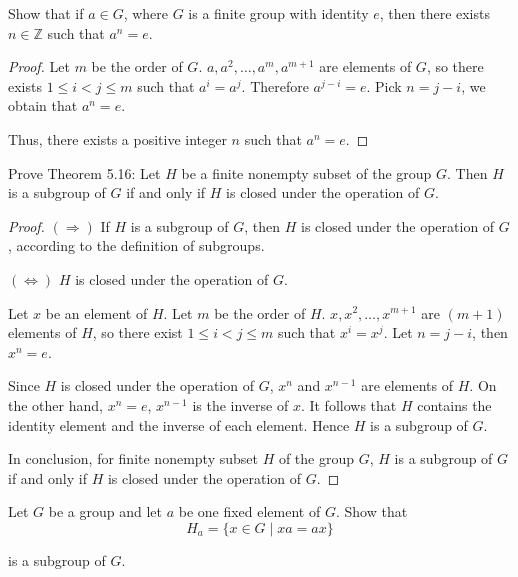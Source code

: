\begin{exercise}
    Show that if $a\in G$, where $G$ is a finite group with identity $e$, then there exists $n\in\mathbb{Z}$ such that $a^{n} = e$.
\end{exercise}

\begin{proof}
    Let $m$ be the order of $G$. $a, a^{2}, \ldots, a^{m}, a^{m+1}$ are elements of $G$, so there exists $1\leq i < j \leq m$ such that $a^{i} = a^{j}$. Therefore $a^{j-i} = e$. Pick $n = j - i$, we obtain that $a^{n} = e$.

    Thus, there exists a positive integer $n$ such that $a^{n} = e$.
\end{proof}

\begin{exercise}
    Prove Theorem 5.16: Let $H$ be a finite nonempty subset of the group $G$. Then $H$ is a subgroup of $G$ if and only if $H$ is closed under the operation of $G$.
\end{exercise}

\begin{proof}
    $(\Rightarrow)$ If $H$ is a subgroup of $G$, then $H$ is closed under the operation of $G$, according to the definition of subgroups.

    $(\Leftrightarrow)$ $H$ is closed under the operation of $G$.

    Let $x$ be an element of $H$. Let $m$ be the order of $H$. $x, x^{2}, \ldots, x^{m+1}$ are $(m+1)$ elements of $H$, so there exist $1\leq i < j \leq m$ such that $x^{i} = x^{j}$. Let $n = j - i$, then $x^{n} = e$.

    Since $H$ is closed under the operation of $G$, $x^{n}$ and $x^{n-1}$ are elements of $H$. On the other hand, $x^{n} = e$, $x^{n-1}$ is the inverse of $x$. It follows that $H$ contains the identity element and the inverse of each element. Hence $H$ is a subgroup of $G$.

    In conclusion, for finite nonempty subset $H$ of the group $G$, $H$ is a subgroup of $G$ if and only if $H$ is closed under the operation of $G$.
\end{proof}

\begin{exercise}
    Let $G$ be a group and let $a$ be one fixed element of $G$. Show that
    \[
        H_{a} = \{ x\in G \mid xa = ax \}
    \]

    is a subgroup of $G$.
\end{exercise}

